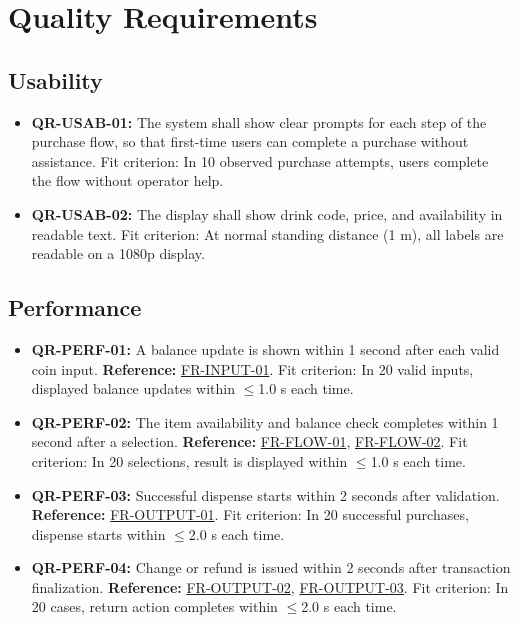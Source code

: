 \documentclass[a4paper,12pt]{article}
\newcommand{\reqref}[1]{\hyperlink{req:#1}{#1}}
\begin{document}
    \section{Quality Requirements}

    \subsection{Usability}
    \begin{itemize}
        \item \textbf{QR-USAB-01:} The system shall show clear prompts for each step of the purchase flow, so that first-time users can complete a purchase without assistance.
        Fit criterion: In 10 observed purchase attempts, users complete the flow without operator help.

        \item \textbf{QR-USAB-02:} The display shall show drink code, price, and availability in readable text.
        Fit criterion: At normal standing distance (1 m), all labels are readable on a 1080p display.
    \end{itemize}

    \subsection{Performance}
    \begin{itemize}
        \item \textbf{QR-PERF-01:} A balance update is shown within 1 second after each valid coin input. \textbf{Reference:} \reqref{FR-INPUT-01}.
        Fit criterion: In 20 valid inputs, displayed balance updates within $\leq$1.0 s each time.

        \item \textbf{QR-PERF-02:} The item availability and balance check completes within 1 second after a selection. \textbf{Reference:} \reqref{FR-FLOW-01}, \reqref{FR-FLOW-02}.
        Fit criterion: In 20 selections, result is displayed within $\leq$1.0 s each time.

        \item \textbf{QR-PERF-03:} Successful dispense starts within 2 seconds after validation. \textbf{Reference:} \reqref{FR-OUTPUT-01}.
        Fit criterion: In 20 successful purchases, dispense starts within $\leq$2.0 s each time.

        \item \textbf{QR-PERF-04:} Change or refund is issued within 2 seconds after transaction finalization. \textbf{Reference:} \reqref{FR-OUTPUT-02}, \reqref{FR-OUTPUT-03}.
        Fit criterion: In 20 cases, return action completes within $\leq$2.0 s each time.
    \end{itemize}
\end{document}
